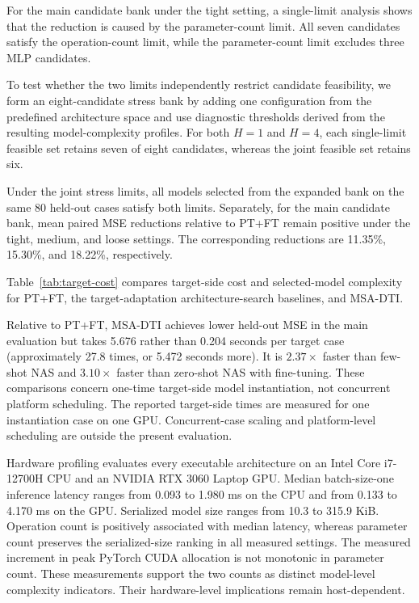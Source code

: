 \documentclass[a4paper,fleqn]{cas-sc}
\begin{document}
For the main candidate bank under the tight setting, a single-limit analysis
shows that the reduction is caused by the parameter-count limit. All seven
candidates satisfy the operation-count limit, while the parameter-count limit
excludes three MLP candidates.

To test whether the two limits independently restrict candidate
feasibility, we form an eight-candidate stress bank by adding one configuration
from the predefined architecture space and use diagnostic thresholds derived
from the resulting model-complexity profiles. For both $H=1$ and $H=4$, each
single-limit feasible set retains seven of eight candidates, whereas the joint
feasible set retains six.

Under the joint stress limits, all models selected from the expanded bank on
the same 80 held-out cases satisfy both limits. Separately, for the main
candidate bank, mean paired MSE reductions relative to PT+FT remain positive
under the tight, medium, and loose settings. The corresponding reductions
are 11.35\%, 15.30\%, and 18.22\%, respectively.

Table~\ref{tab:target-cost} compares target-side cost and selected-model
complexity for PT+FT, the target-adaptation architecture-search baselines, and
MSA-DTI.



Relative to PT+FT, MSA-DTI achieves lower held-out MSE in the main
evaluation but takes 5.676 rather than 0.204 seconds per target case
(approximately 27.8 times, or 5.472 seconds more). It is \(2.37\times\)
faster than few-shot NAS and \(3.10\times\) faster than zero-shot NAS
with fine-tuning. These comparisons concern one-time target-side model
instantiation, not concurrent platform scheduling. The
reported target-side times are measured for one instantiation case on one GPU.
Concurrent-case scaling and platform-level scheduling are outside the present
evaluation.

Hardware profiling evaluates every executable architecture on an Intel Core
i7-12700H CPU and an NVIDIA RTX 3060 Laptop GPU. Median batch-size-one
inference latency ranges from 0.093 to 1.980 ms on the CPU and from 0.133 to
4.170 ms on the GPU. Serialized model size ranges from 10.3 to 315.9 KiB.
Operation count is positively associated with median latency, whereas
parameter count preserves the serialized-size ranking in all measured
settings. The measured increment in peak PyTorch CUDA allocation is not
monotonic in parameter count. These measurements support the two counts as
distinct model-level complexity indicators. Their hardware-level
implications remain host-dependent.
\end{document}
